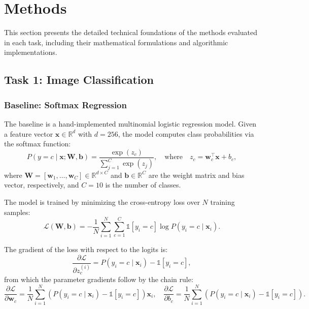\documentclass[onecolumn,a4paper,12pt]{IEEEtran}
\begin{document}
\section{Methods}
\label{sec:methods}

This section presents the detailed technical foundations of the methods evaluated in each task, including their mathematical formulations and algorithmic implementations.

\subsection{Task 1: Image Classification}

\subsubsection{Baseline: Softmax Regression}

The baseline is a hand-implemented multinomial logistic regression model. Given a feature vector $\mathbf{x} \in \mathbb{R}^d$ with $d=256$, the model computes class probabilities via the softmax function:
\begin{equation}
P(y=c \mid \mathbf{x}; \mathbf{W}, \mathbf{b}) = \frac{\exp(z_c)}{\sum_{j=1}^{C} \exp(z_j)}, \quad \text{where} \quad z_c = \mathbf{w}_c^{\top} \mathbf{x} + b_c,
\end{equation}
where $\mathbf{W} = [\mathbf{w}_1, \dots, \mathbf{w}_C] \in \mathbb{R}^{d \times C}$ and $\mathbf{b} \in \mathbb{R}^C$ are the weight matrix and bias vector, respectively, and $C=10$ is the number of classes.

The model is trained by minimizing the cross-entropy loss over $N$ training samples:
\begin{equation}
\mathcal{L}(\mathbf{W}, \mathbf{b}) = -\frac{1}{N} \sum_{i=1}^{N} \sum_{c=1}^{C} \mathbb{1}[y_i = c] \log P(y_i=c \mid \mathbf{x}_i).
\end{equation}

The gradient of the loss with respect to the logits is:
\begin{equation}
\frac{\partial \mathcal{L}}{\partial z_c^{(i)}} = P(y_i=c \mid \mathbf{x}_i) - \mathbb{1}[y_i = c],
\end{equation}
from which the parameter gradients follow by the chain rule:
\begin{equation}
\frac{\partial \mathcal{L}}{\partial \mathbf{w}_c} = \frac{1}{N} \sum_{i=1}^{N} \left(P(y_i=c \mid \mathbf{x}_i) - \mathbb{1}[y_i=c]\right) \mathbf{x}_i, \quad \frac{\partial \mathcal{L}}{\partial b_c} = \frac{1}{N} \sum_{i=1}^{N} \left(P(y_i=c \mid \mathbf{x}_i) - \mathbb{1}[y_i=c]\right).
\end{equation}
\end{document}
